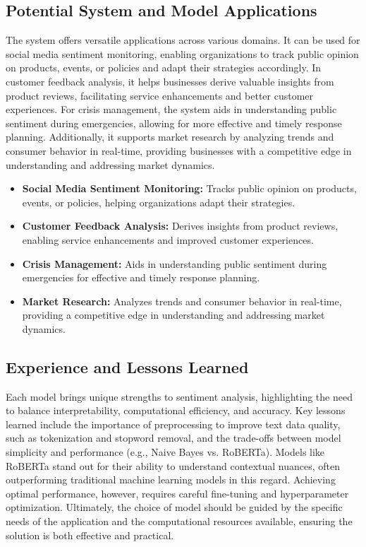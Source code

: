 \documentclass[journal]{IEEEtran}
\begin{document}
\subsection{\textbf{Potential System and Model Applications}}
The system offers versatile applications across various domains. It can be used for social media sentiment monitoring, enabling organizations to track public opinion on products, events, or policies and adapt their strategies accordingly. In customer feedback analysis, it helps businesses derive valuable insights from product reviews, facilitating service enhancements and better customer experiences. For crisis management, the system aids in understanding public sentiment during emergencies, allowing for more effective and timely response planning. Additionally, it supports market research by analyzing trends and consumer behavior in real-time, providing businesses with a competitive edge in understanding and addressing market dynamics.

\begin{itemize}
    \item \textbf{Social Media Sentiment Monitoring:} Tracks public opinion on products, events, or policies, helping organizations adapt their strategies.
    \item \textbf{Customer Feedback Analysis:} Derives insights from product reviews, enabling service enhancements and improved customer experiences.
    \item \textbf{Crisis Management:} Aids in understanding public sentiment during emergencies for effective and timely response planning.
    \item \textbf{Market Research:} Analyzes trends and consumer behavior in real-time, providing a competitive edge in understanding and addressing market dynamics.
\end{itemize}

\subsection{\textbf{Experience and Lessons Learned}}
Each model brings unique strengths to sentiment analysis, highlighting the need to balance interpretability, computational efficiency, and accuracy. Key lessons learned include the importance of preprocessing to improve text data quality, such as tokenization and stopword removal, and the trade-offs between model simplicity and performance (e.g., Naive Bayes vs. RoBERTa).  Models like RoBERTa stand out for their ability to understand contextual nuances, often outperforming traditional machine learning models in this regard. Achieving optimal performance, however, requires careful fine-tuning and hyperparameter optimization. Ultimately, the choice of model should be guided by the specific needs of the application and the computational resources available, ensuring the solution is both effective and practical.
\end{document}
